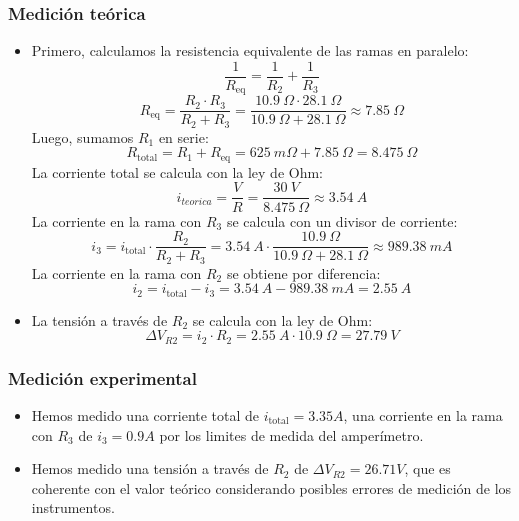 \documentclass{article}
\begin{document}
\subsubsection{Medición teórica}
\begin{itemize}
  \item Primero, calculamos la resistencia equivalente de las ramas en paralelo:
\begin{equation}
  \frac{1}{R_{\text{eq}}} = \frac{1}{R_2} + \frac{1}{R_3} 
\end{equation}
\begin{equation}
  R_{\text{eq}} = \frac{R_2 \cdot R_3}{R_2 + R_3} = \frac{10.9\ \Omega \cdot 28.1\ \Omega}{10.9\ \Omega + 28.1\ \Omega} \approx 7.85\ \Omega
\end{equation}
Luego, sumamos $R_{1}$ en serie:
\begin{equation}
  R_{\text{total}} = R_1 + R_{\text{eq}} = 625\ m \Omega + 7.85\ \Omega = 8.475\ \Omega
\end{equation}
La corriente total se calcula con la ley de Ohm:
\begin{equation}
  i_{teorica} = \frac{V}{R} = \frac{30\ V}{8.475\ \Omega} \approx 3.54\ A
\end{equation}
La corriente en la rama con $R_3$ se calcula con un divisor de corriente:
\begin{equation}
  i_{3} = i_{\text{total}} \cdot \frac{R_{2}}{R_2 + R_{3}} = 3.54\ A \cdot \frac{10.9\ \Omega}{10.9\ \Omega + 28.1\ \Omega} \approx 989.38\ mA
\end{equation}
La corriente en la rama con $R_2$ se obtiene por diferencia:
\begin{equation}
  i_{2} = i_{\text{total}} - i_{3} = 3.54\ A - 989.38\ mA = 2.55\ A
\end{equation}
\item La tensión a través de $R_2$ se calcula con la ley de Ohm:
\begin{equation}
  \Delta V_{R2} = i_{2} \cdot R_2 = 2.55\ A \cdot 10.9\ \Omega = 27.79\ V
\end{equation}
\end{itemize}

\subsubsection{Medición experimental}
\begin{itemize}
  \item Hemos medido una corriente total de $i_{\text{total}} = 3.35 A$, una corriente en la rama con $R_3$ de $i_{3} = 0.9 A$ por los limites de medida del amperímetro.
  \item Hemos medido una tensión a través de $R_2$ de $\Delta V_{R2} = 26.71 V$, que es coherente con el valor teórico considerando posibles errores de medición de los instrumentos.
\end{itemize}
\end{document}
